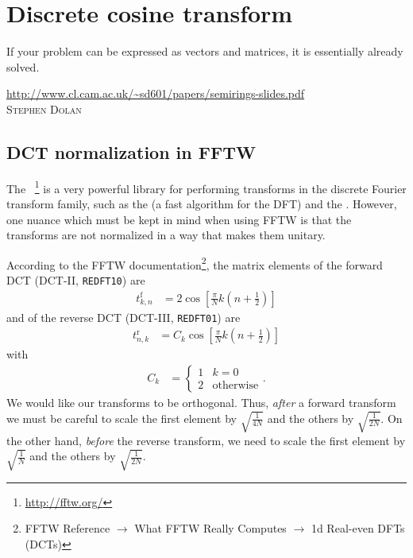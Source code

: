 \chapter{Discrete cosine transform}

\label{chap:dct}

\epigraph{
If your problem can be expressed as vectors and matrices, it is essentially already solved.
}{
\url{http://www.cl.cam.ac.uk/~sd601/papers/semirings-slides.pdf} \\
\textsc{Stephen Dolan}
}


\section{DCT normalization in FFTW}

The ~\cite{frigo2005design}\footnote{
	\url{http://fftw.org/}
} is a very powerful library for performing transforms in the discrete Fourier transform family, such as the  (a fast algorithm for the DFT) and the .
However, one nuance which must be kept in mind when using FFTW is that the transforms are not normalized in a way that makes them unitary.

According to the FFTW documentation\footnote{
	FFTW Reference $\to$ What FFTW Really Computes $\to$ 1d Real-even DFTs (DCTs)
}, the matrix elements of the forward DCT (DCT-II, \texttt{REDFT10}) are
\begin{align}
	t^\textrm{f}_{k,n}
	&= 2 \cos{\left[ \frac{\pi}{N} k \left( n + \frac{1}{2} \right) \right]}
\end{align}
and of the reverse DCT (DCT-III, \texttt{REDFT01}) are
\begin{align}
	t^\textrm{r}_{n,k}
	&= C_k \cos{\left[ \frac{\pi}{N} k \left( n + \frac{1}{2} \right) \right]}
\end{align}
with
\begin{align}
	C_k
	&= \begin{cases}
			1 & k = 0 \\
			2 & \text{otherwise}
		\end{cases}.
\end{align}
We would like our transforms to be orthogonal.
Thus, \emph{after} a forward transform we must be careful to scale the first element by $\sqrt{\frac{1}{4 N}}$ and the others by $\sqrt{\frac{1}{2 N}}$.
On the other hand, \emph{before} the reverse transform, we need to scale the first element by $\sqrt{\frac{1}{N}}$ and the others by $\sqrt{\frac{1}{2 N}}$.


